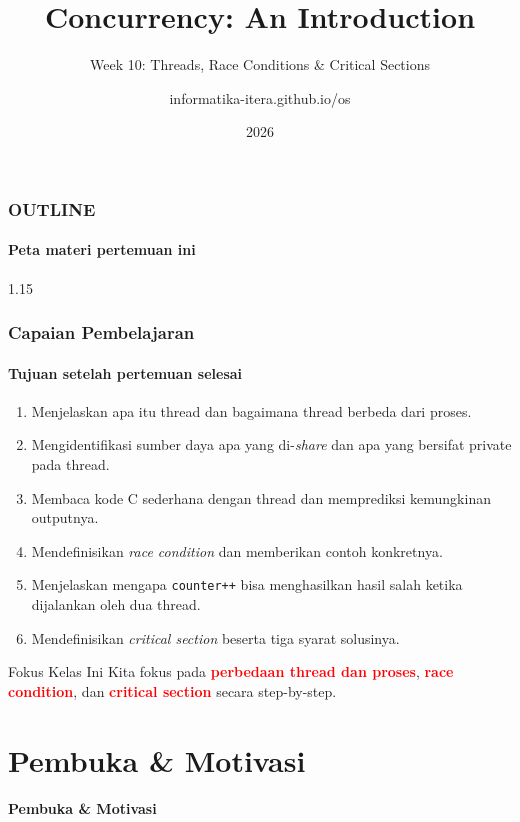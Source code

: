 \documentclass[t,aspectratio=169,xcolor=dvipsnames]{beamer}
\title[Concurrency Introduction]{Concurrency: An Introduction}
\subtitle{Week 10: Threads, Race Conditions \& Critical Sections}
\author[informatika-itera.github.io/os]{informatika-itera.github.io/os}
\institute[ITERA]{Program Studi Teknik Informatika \\ Institut Teknologi Sumatera}
\date{\textcolor{nyublue}{2026}}
\newcommand{\tem}[1]{\textbf{\textcolor{red}{#1}}}
\begin{document}
\begin{frame}
    \titlepage
\end{frame}

\begin{frame}
    \frametitle{OUTLINE}
    \framesubtitle{Peta materi pertemuan ini}
    \small
    \begin{spacing}{1.15}
        \tableofcontents
    \end{spacing}
\end{frame}

\begin{frame}
    \frametitle{Capaian Pembelajaran}
    \framesubtitle{Tujuan setelah pertemuan selesai}
    \small
    \begin{enumerate}
        \item Menjelaskan apa itu thread dan bagaimana thread berbeda dari proses.
        \item Mengidentifikasi sumber daya apa yang di-\textit{share} dan apa yang bersifat private pada thread.
        \item Membaca kode C sederhana dengan thread dan memprediksi kemungkinan outputnya.
        \item Mendefinisikan \textit{race condition} dan memberikan contoh konkretnya.
        \item Menjelaskan mengapa \texttt{counter++} bisa menghasilkan hasil salah ketika dijalankan oleh dua thread.
        \item Mendefinisikan \textit{critical section} beserta tiga syarat solusinya.
    \end{enumerate}
    \begin{exampleblock}{Fokus Kelas Ini}
        Kita fokus pada \tem{perbedaan thread dan proses}, \tem{race condition}, dan \tem{critical section} secara step-by-step.
    \end{exampleblock}
\end{frame}

\section{Pembuka \& Motivasi}

\begin{frame}[plain]
    \begin{center}
        \vspace{3cm}
        \Huge\textbf{Pembuka \& Motivasi}
    \end{center}
\end{frame}
\end{document}
